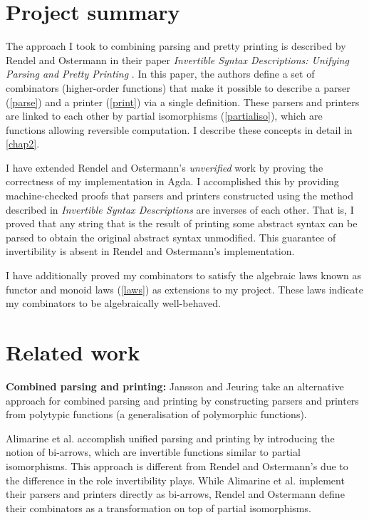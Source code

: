 \documentclass[12pt,a4paper,twoside,openright]{report}
\begin{document}
\section{Project summary}

The approach I took to combining parsing and pretty printing is described by Rendel and Ostermann in their paper \emph{Invertible Syntax Descriptions: Unifying Parsing and Pretty Printing} \cite{invert}. In this paper, the authors define a set of combinators (higher-order functions) that make it possible to describe a parser (\autoref{parse}) and a printer (\autoref{print}) via a single definition. These parsers and printers are linked to each other by partial isomorphisms (\autoref{partialiso}), which are functions allowing reversible computation. I describe these concepts in detail in \autoref{chap2}.

I have extended Rendel and Ostermann's \emph{unverified} work by proving the correctness of my implementation in Agda. I accomplished this by providing machine-checked proofs that parsers and printers constructed using the method described in \emph{Invertible Syntax Descriptions} are inverses of each other. That is, I {proved} that any string that is the result of printing some abstract syntax can be parsed to obtain the original abstract syntax unmodified. This guarantee of invertibility is absent in Rendel and Ostermann's implementation.

I have additionally proved my combinators to satisfy the algebraic laws known as functor and monoid laws (\autoref{laws}) as extensions to my project. These laws indicate my combinators to be algebraically well-behaved.

\section{Related work}

{\bf Combined parsing and printing:} Jansson and Jeuring \cite{jj1}\cite{jj2} take an alternative approach for combined parsing and printing by constructing parsers and printers from polytypic functions (a generalisation of polymorphic functions).

Alimarine et al. \cite{alimarine} accomplish unified parsing and printing by introducing the notion of bi-arrows, which are invertible functions similar to partial isomorphisms. This approach is different from Rendel and Ostermann's due to the difference in the role invertibility plays. While Alimarine et al. implement their parsers and printers directly as bi-arrows, Rendel and Ostermann define their combinators as a transformation on top of partial isomorphisms.
\end{document}
